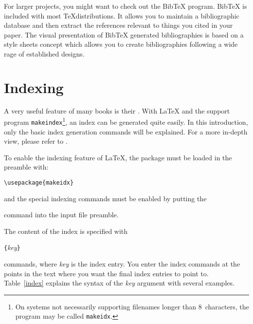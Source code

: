 For larger projects, you might want to check out the Bib\TeX{}
program. Bib\TeX{} is included with most \TeX distributions. It
allows you to maintain a bibliographic database and then extract the
references relevant to things you cited in your paper. The visual
presentation of Bib\TeX{} generated bibliographies is based on a style
sheets concept which allows you to create bibliographies following
a wide rage of established designs.

\section{Indexing} \label{sec:indexing}
A very useful feature of many books is their . With \LaTeX{}
and the support program \texttt{makeindex}\footnote{On systems not
  necessarily supporting
  filenames longer than 8~characters, the program may be called
  \texttt{makeidx}.}, an index can be generated quite easily.  In this
introduction, only the basic index generation commands will be explained.
For a more in-depth view, please refer to \companion.   

To enable the indexing feature of \LaTeX{}, the  package
must be loaded in the preamble with:
\begin{command}
\verb|\usepackage{makeidx}|
\end{command}
\noindent and the special indexing commands must be enabled by putting 
the
\begin{command}
\end{command}
\noindent command into the input file preamble.

The content of the index is specified with
\begin{command}
  \verb|{|\emph{key}\verb|}|
\end{command}
\noindent commands, where \emph{key} is the index entry. You enter the
index commands at the points in the text where you want the final index
entries to point to.  Table~\ref{index} explains the syntax of the
\emph{key} argument with several examples.

